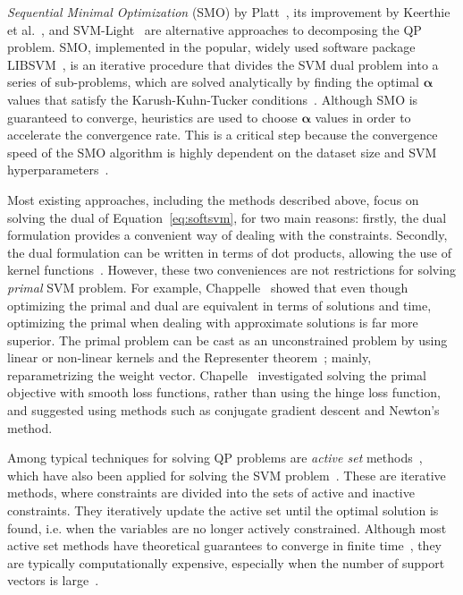 \documentclass[reqno]{vcuthesis}
\numberwithin{equation}{chapter}
\begin{document}
\textit{Sequential Minimal Optimization} (SMO) by Platt~\cite{Platt1998}, its improvement by Keerthie et al.~\cite{keerthi2001improvements}, and SVM-Light~\cite{Joachims1999} are alternative approaches to decomposing the QP problem. SMO, implemented in the popular, widely used software package LIBSVM~\cite{CC01a}, is an iterative procedure that divides the SVM dual problem into a series of sub-problems, which are solved analytically by finding the optimal $\bm \alpha$ values that satisfy the Karush-Kuhn-Tucker conditions~\cite{Boyd2004}. Although SMO is guaranteed to converge, heuristics are used to choose $\bm \alpha$ values in order to accelerate the convergence rate. This is a critical step because the convergence speed of the SMO algorithm is highly dependent on the dataset size and SVM hyperparameters~\cite{Schoelkopf2002}.

Most existing approaches, including the methods described above, focus on solving the dual of Equation~\ref{eq:softsvm}, for two main reasons: firstly, the dual formulation provides a convenient way of dealing with the constraints. Secondly, the dual formulation can be written in terms of dot products, allowing the use of kernel functions~\cite{bottou2007large}. However, these two conveniences are not restrictions for solving \textit{primal} SVM problem. For example, Chappelle~\cite{Chapelle2007} showed that even though optimizing the primal and dual are equivalent in terms of solutions and time, optimizing the primal when dealing with approximate solutions is far more superior. The primal problem can be cast as an unconstrained problem by using linear or non-linear kernels and the Representer theorem~\cite{scholkopf2001generalized}; mainly, reparametrizing the weight vector. Chapelle~\cite{Chapelle2007} investigated solving the primal objective with smooth loss functions, rather than using the hinge loss function, and suggested using methods such as conjugate gradient descent and Newton's method.

Among typical techniques for solving QP problems are \textit{active set} methods~\cite{wright1999numerical}, which have also been applied for solving the SVM problem~\cite{cauwenberghs2001incremental,hastie2004entire,scheinberg2006efficient}. These are iterative methods, where constraints are divided into the sets of active and inactive constraints. They iteratively update the active set until the optimal solution is found, i.e. when the variables are no longer actively constrained. Although most active set methods have theoretical guarantees to converge in finite time~\cite{scheinberg2006efficient,shilton2005incremental}, they are typically computationally expensive, especially when the number of support vectors is large~\cite{shawe2011review}.
\end{document}
